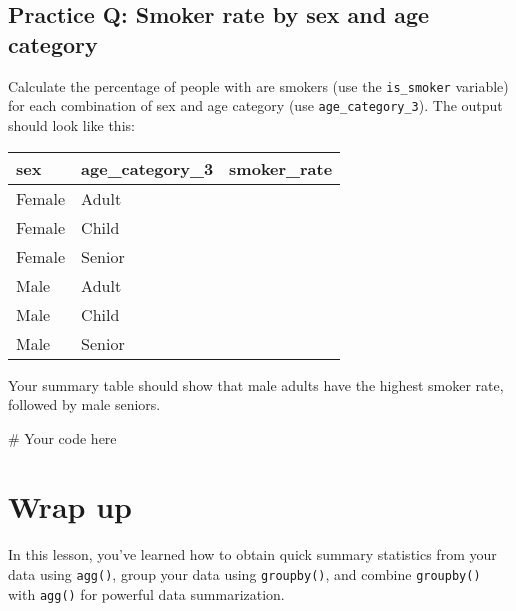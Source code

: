\documentclass[
  letterpaper,
  DIV=11,
  numbers=noendperiod]{scrreprt}
\newenvironment{Shaded}{\begin{snugshade}}{\end{snugshade}}
\newcommand{\CommentTok}[1]{\textcolor[rgb]{0.37,0.37,0.37}{#1}}
\begin{document}
\begin{tcolorbox}[enhanced jigsaw, colframe=quarto-callout-tip-color-frame, opacityback=0, titlerule=0mm, bottomrule=.15mm, breakable, leftrule=.75mm, colbacktitle=quarto-callout-tip-color!10!white, title=\textcolor{quarto-callout-tip-color}{\faLightbulb}\hspace{0.5em}{Practice}, rightrule=.15mm, coltitle=black, opacitybacktitle=0.6, colback=white, left=2mm, arc=.35mm, toptitle=1mm, bottomtitle=1mm, toprule=.15mm]

\subsection{Practice Q: Smoker rate by sex and age
category}\label{practice-q-smoker-rate-by-sex-and-age-category}

Calculate the percentage of people with are smokers (use the
\texttt{is\_smoker} variable) for each combination of sex and age
category (use \texttt{age\_category\_3}). The output should look like
this:

\begin{longtable}[]{@{}lll@{}}
\toprule\noalign{}
sex & age\_category\_3 & smoker\_rate \\
\midrule\noalign{}
\endhead
\bottomrule\noalign{}
\endlastfoot
Female & Adult & \\
Female & Child & \\
Female & Senior & \\
Male & Adult & \\
Male & Child & \\
Male & Senior & \\
\end{longtable}

Your summary table should show that male adults have the highest smoker
rate, followed by male seniors.

\begin{Shaded}
\begin{Highlighting}[]
\CommentTok{\# Your code here}
\end{Highlighting}
\end{Shaded}

\end{tcolorbox}

\section{Wrap up}\label{wrap-up-8}

In this lesson, you've learned how to obtain quick summary statistics
from your data using \texttt{agg()}, group your data using
\texttt{groupby()}, and combine \texttt{groupby()} with \texttt{agg()}
for powerful data summarization.
\end{document}
